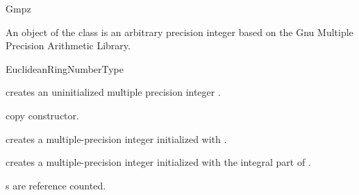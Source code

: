 \ccDefGlobalScope{}
\begin{ccRefClass} {Gmpz}
\label{Gmpz}

\ccDefinition

An object of the class  is an arbitrary precision integer 
based on the {\sc Gnu} Multiple Precision Arithmetic Library. 


\ccIsModel
EuclideanRingNumberType

\ccCreation
{}

             {creates an uninitialized multiple precision integer \ccVar.}

\ccHidden {}
            {copy constructor.}

            {creates a multiple-precision integer initialized with
             .}

            {creates a multiple-precision integer initialized with
             the integral part of .}


\ccImplementation
{}s are reference counted.

\end{ccRefClass} 
